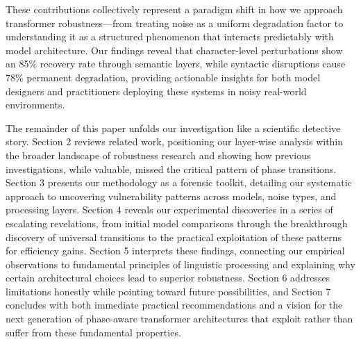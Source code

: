 These contributions collectively represent a paradigm shift in how we approach transformer robustness---from treating noise as a uniform degradation factor to understanding it as a structured phenomenon that interacts predictably with model architecture. Our findings reveal that character-level perturbations show an 85\% recovery rate through semantic layers, while syntactic disruptions cause 78\% permanent degradation, providing actionable insights for both model designers and practitioners deploying these systems in noisy real-world environments.

The remainder of this paper unfolds our investigation like a scientific detective story. Section 2 reviews related work, positioning our layer-wise analysis within the broader landscape of robustness research and showing how previous investigations, while valuable, missed the critical pattern of phase transitions. Section 3 presents our methodology as a forensic toolkit, detailing our systematic approach to uncovering vulnerability patterns across models, noise types, and processing layers. Section 4 reveals our experimental discoveries in a series of escalating revelations, from initial model comparisons through the breakthrough discovery of universal transitions to the practical exploitation of these patterns for efficiency gains. Section 5 interprets these findings, connecting our empirical observations to fundamental principles of linguistic processing and explaining why certain architectural choices lead to superior robustness. Section 6 addresses limitations honestly while pointing toward future possibilities, and Section 7 concludes with both immediate practical recommendations and a vision for the next generation of phase-aware transformer architectures that exploit rather than suffer from these fundamental properties.